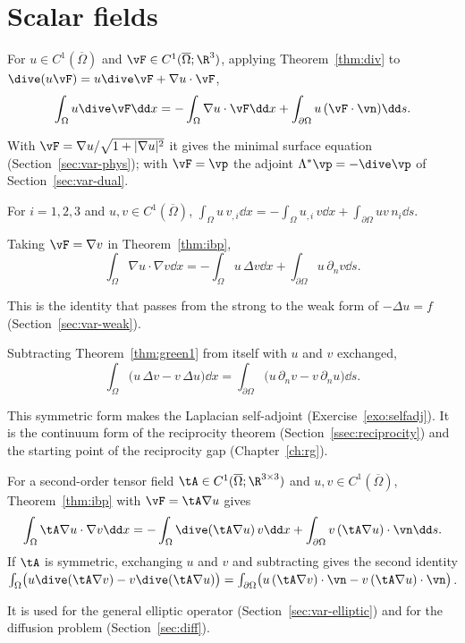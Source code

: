 \section{Scalar fields}
\begin{theorem}\label{thm:ibp}
For $u\in C^1(\overline\Omega)$ and $\vF\in C^1(\overline\Omega;\R^3)$,
applying Theorem~\ref{thm:div} to $\dive(u\vF)=u\dive\vF+\nabla u\cdot\vF$,
\[
  \int_\Omega u\dive\vF\dd x=-\int_\Omega\nabla u\cdot\vF\dd x
  +\int_{\partial\Omega}u\,(\vF\cdot\vn)\dd s .
\]
\end{theorem}
With $\vF=\nabla u/\sqrt{1+|\nabla u|^2}$ it gives the minimal surface
equation (Section~\ref{sec:var-phys}); with $\vF=\vp$ the adjoint
$\Lambda^\ast\vp=-\dive\vp$ of Section~\ref{sec:var-dual}.

\begin{corollary}[Componentwise]\label{cor:comp}
For $i=1,2,3$ and $u,v\in C^1(\overline\Omega)$,
$\displaystyle\int_\Omega u\,v_{,i}\dd x=-\int_\Omega u_{,i}\,v\dd x+\int_{\partial\Omega}uv\,n_i\dd s$.
\end{corollary}

\begin{theorem}\label{thm:green1}
Taking $\vF=\nabla v$ in Theorem~\ref{thm:ibp},
\[
  \int_\Omega\nabla u\cdot\nabla v\dd x=-\int_\Omega u\,\Delta v\dd x
  +\int_{\partial\Omega}u\,\partial_nv\dd s .
\]
\end{theorem}
This is the identity that passes from the strong to the weak form of
$-\Delta u=f$ (Section~\ref{sec:var-weak}).

\begin{theorem}\label{thm:green2}
Subtracting Theorem~\ref{thm:green1} from itself with $u$ and $v$ exchanged,
\[
  \int_\Omega\bigl(u\,\Delta v-v\,\Delta u\bigr)\dd x
  =\int_{\partial\Omega}\bigl(u\,\partial_nv-v\,\partial_nu\bigr)\dd s .
\]
\end{theorem}
This symmetric form makes the Laplacian self-adjoint
(Exercise~\ref{exo:selfadj}). It is the continuum form of the reciprocity
theorem (Section~\ref{ssec:reciprocity}) and the starting point of the
reciprocity gap (Chapter~\ref{ch:rg}).

\begin{theorem}\label{thm:ibp-matrix}
For a second-order tensor field $\tA\in C^1(\overline\Omega;\R^{3\times3})$ and
$u,v\in C^1(\overline\Omega)$, Theorem~\ref{thm:ibp} with $\vF=\tA\nabla u$ gives
\[
  \int_\Omega\tA\nabla u\cdot\nabla v\dd x
  =-\int_\Omega\dive(\tA\nabla u)\,v\dd x+\int_{\partial\Omega}v\,(\tA\nabla u)\cdot\vn\dd s .
\]
If $\tA$ is symmetric, exchanging $u$ and $v$ and subtracting gives the
second identity
$\int_\Omega\bigl(u\dive(\tA\nabla v)-v\dive(\tA\nabla u)\bigr)
=\int_{\partial\Omega}\bigl(u\,(\tA\nabla v)\cdot\vn-v\,(\tA\nabla u)\cdot\vn\bigr)$.
\end{theorem}
It is used for the general elliptic operator (Section~\ref{sec:var-elliptic})
and for the diffusion problem (Section~\ref{sec:diff}).

